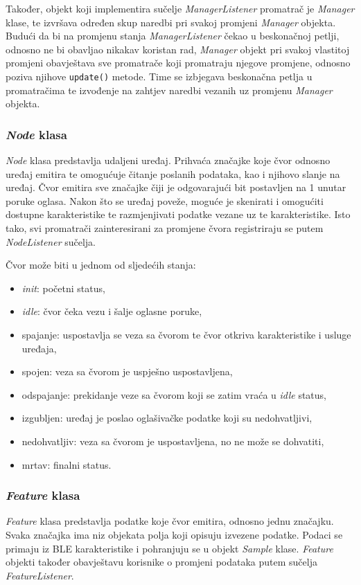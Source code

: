 Također, objekt koji implementira sučelje \textit{ManagerListener} promatrač je \textit{Manager} klase, te izvršava određen skup naredbi pri svakoj promjeni \textit{Manager} objekta. Budući da bi na promjenu stanja \textit{ManagerListener} čekao u beskonačnoj petlji, odnosno ne bi obavljao nikakav koristan rad, \textit{Manager} objekt pri svakoj vlastitoj promjeni obavještava sve promatrače koji promatraju njegove promjene, odnosno poziva njihove \lstinline|update()| metode. Time se izbjegava beskonačna petlja u promatračima te izvođenje na zahtjev naredbi vezanih uz promjenu \textit{Manager} objekta.


\subsubsection{\textit{Node} klasa}
\textit{Node} klasa predstavlja udaljeni uređaj. Prihvaća značajke koje čvor odnosno uređaj emitira te omogućuje čitanje poslanih podataka, kao i njihovo slanje na uređaj. Čvor emitira sve značajke čiji je odgovarajući bit postavljen na 1 unutar poruke oglasa. Nakon što se uređaj poveže, moguće je skenirati i omogućiti dostupne karakteristike te razmjenjivati podatke vezane uz te karakteristike. Isto tako, svi promatrači zainteresirani za promjene čvora registriraju se putem \textit{NodeListener} sučelja.

Čvor može biti u jednom od sljedećih stanja:
\begin{itemize}
	\item \textit{init}: početni status,
	\item \textit{idle}: čvor čeka vezu i šalje oglasne poruke,
	\item spajanje: uspostavlja se veza sa čvorom te čvor otkriva karakteristike i usluge uređaja,
	\item spojen: veza sa čvorom je uspješno uspostavljena, 
	\item odspajanje: prekidanje veze sa čvorom koji se zatim vraća u \textit{idle} status, 
	\item izgubljen: uređaj je poslao oglašivačke podatke koji su nedohvatljivi,
	\item nedohvatljiv: veza sa čvorom je uspostavljena, no ne može se dohvatiti, 
	\item mrtav: finalni status.
\end{itemize}

\subsubsection{\textit{Feature} klasa}
\textit{Feature} klasa predstavlja podatke koje čvor emitira, odnosno jednu značajku. Svaka značajka ima niz objekata polja koji opisuju izvezene podatke. Podaci se primaju iz BLE karakteristike i pohranjuju se u objekt \textit{Sample} klase. \textit{Feature} objekti također obavještavu korisnike o promjeni podataka putem sučelja \textit{FeatureListener}.



